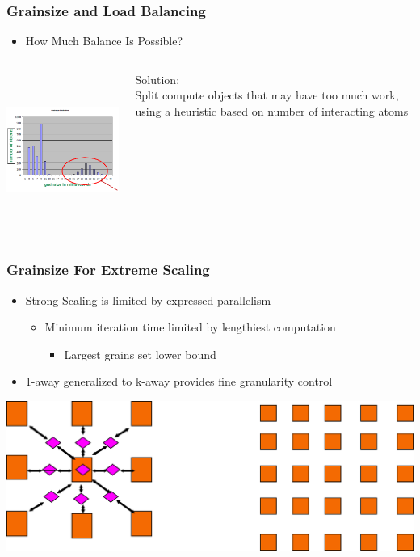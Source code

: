 \begin{frame}[fragile]
\frametitle{Grainsize and Load Balancing}
\begin{itemize}
\item[] How Much Balance Is Possible?
\end{itemize}
\begin{columns}
  \begin{column}[T]{2.8in}
  \includegraphics[width=2.8in, height=2.0in]{figures/histogramGrains}
  \end{column}

  \begin{column}[T]{5cm}
  Solution:\\ 
  Split compute objects that may have too much work,
  using a heuristic based on number of interacting atoms
  \end{column}
\end{columns}
\end{frame}

\begin{frame}[fragile]
\frametitle{Grainsize For Extreme Scaling}
\begin{itemize}
 \item Strong Scaling is limited by expressed parallelism
 \begin{itemize}
  \item Minimum iteration time limited by lengthiest computation
  \begin {itemize} 
    \item Largest grains set lower bound
  \end{itemize}
 \end{itemize}
 \item 1-away generalized to k-away provides fine granularity control
\end{itemize}
\begin{centering}
\includegraphics[width=1.0\textwidth]{figures/1away2away}
\end{centering}
\end{frame}


